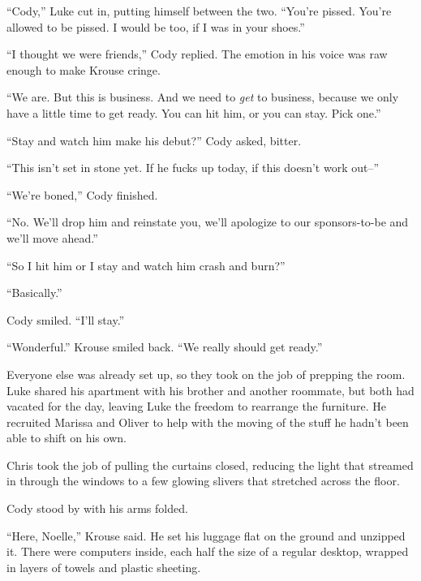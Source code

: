 ``Cody,'' Luke cut in, putting himself between the two.  ``You're pissed.  You're allowed to be pissed.  I would be too, if I was in your shoes.''



``I thought we were friends,'' Cody replied.  The emotion in his voice was raw enough to make Krouse cringe.



``We are.  But this is business.  And we need to \emph{get} to business, because we only have a little time to get ready.  You can hit him, or you can stay.  Pick one.''



``Stay and watch him make his debut?''  Cody asked, bitter.



``This isn't set in stone yet.  If he fucks up today, if this doesn't work out--''



``We're boned,'' Cody finished.



``No.  We'll drop him and reinstate you, we'll apologize to our sponsors-to-be and we'll move ahead.''



``So I hit him or I stay and watch him crash and burn?''



``Basically.''



Cody smiled.  ``I'll stay.''



``Wonderful.''  Krouse smiled back.  ``We really should get ready.''



Everyone else was already set up, so they took on the job of prepping the room.  Luke shared his apartment with his brother and another roommate, but both had vacated for the day, leaving Luke the freedom to rearrange the furniture.  He recruited Marissa and Oliver to help with the moving of the stuff he hadn't been able to shift on his own.



Chris took the job of pulling the curtains closed, reducing the light that streamed in through the windows to a few glowing slivers that stretched across the floor.



Cody stood by with his arms folded.



``Here, Noelle,'' Krouse said.  He set his luggage flat on the ground and unzipped it.  There were computers inside, each half the size of a regular desktop, wrapped in layers of towels and plastic sheeting.



